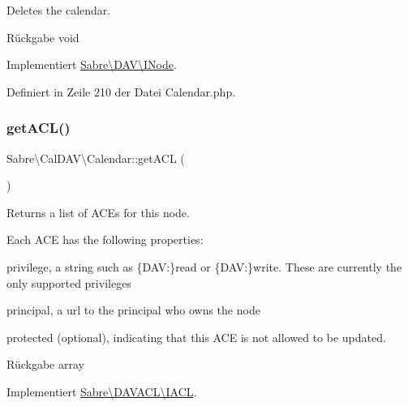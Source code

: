 Deletes the calendar.

\begin{DoxyReturn}{Rückgabe}
void 
\end{DoxyReturn}


Implementiert \mbox{\hyperlink{interface_sabre_1_1_d_a_v_1_1_i_node_a72cd0ee4e36dfced2b0412d14dbd73e6}{Sabre\textbackslash{}\+D\+A\+V\textbackslash{}\+I\+Node}}.



Definiert in Zeile 210 der Datei Calendar.\+php.

\mbox{\label{class_sabre_1_1_cal_d_a_v_1_1_calendar_a48cd2a6648e33d44c9e0e6ee0ba12407}} 
\subsubsection{\texorpdfstring{get\+A\+C\+L()}{getACL()}}
{\footnotesize\ttfamily Sabre\textbackslash{}\+Cal\+D\+A\+V\textbackslash{}\+Calendar\+::get\+A\+CL (\begin{DoxyParamCaption}{ }\end{DoxyParamCaption})}

Returns a list of A\+CE\textquotesingle{}s for this node.

Each A\+CE has the following properties\+:
\begin{DoxyItemize}
\item \textquotesingle{}privilege\textquotesingle{}, a string such as \{D\+AV\+:\}read or \{D\+AV\+:\}write. These are currently the only supported privileges
\item \textquotesingle{}principal\textquotesingle{}, a url to the principal who owns the node
\item \textquotesingle{}protected\textquotesingle{} (optional), indicating that this A\+CE is not allowed to be updated.
\end{DoxyItemize}

\begin{DoxyReturn}{Rückgabe}
array 
\end{DoxyReturn}


Implementiert \mbox{\hyperlink{interface_sabre_1_1_d_a_v_a_c_l_1_1_i_a_c_l_a8fe3b3a5b48eae789d7eb722b340045c}{Sabre\textbackslash{}\+D\+A\+V\+A\+C\+L\textbackslash{}\+I\+A\+CL}}.




